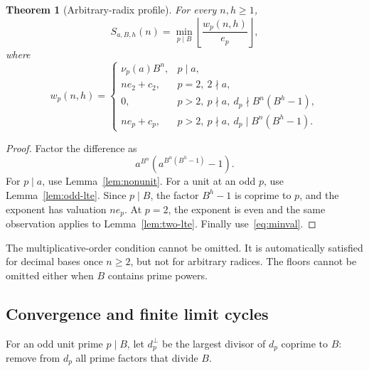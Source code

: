 \documentclass[11pt,a4paper]{article}
\newtheorem{theorem}{Theorem}[section]
\theoremstyle{definition}
\begin{document}
\begin{theorem}[Arbitrary-radix profile]\label{thm:radix-profile}
For every $n,h\ge1$,
\begin{equation}\label{eq:radix-profile}
S_{a,B,h}(n)=\min_{p\mid B}\left\lfloor\frac{w_p(n,h)}{e_p}\right\rfloor,
\end{equation}
where
\begin{equation}\label{eq:wp}
w_p(n,h)=
\begin{cases}
\nu_p(a)B^n,&p\mid a,\\
n e_2+c_2,&p=2,\ 2\nmid a,\\
0,&p>2,\ p\nmid a,\ d_p\nmid B^n(B^h-1),\\
n e_p+c_p,&p>2,\ p\nmid a,\ d_p\mid B^n(B^h-1).
\end{cases}
\end{equation}
\end{theorem}
\begin{proof}
Factor the difference as
\[
a^{B^n}\left(a^{B^n(B^h-1)}-1\right).
\]
For $p\mid a$, use Lemma~\ref{lem:nonunit}. For a unit at an odd $p$,
use Lemma~\ref{lem:odd-lte}. Since $p\mid B$, the factor $B^h-1$ is
coprime to $p$, and the exponent has valuation $ne_p$.
At $p=2$, the exponent is even and the same observation applies to
Lemma~\ref{lem:two-lte}. Finally use~\eqref{eq:minval}.
\end{proof}

The multiplicative-order condition cannot be omitted. It is automatically
satisfied for decimal bases once $n\ge2$, but not for arbitrary radices.
The floors cannot be omitted either when $B$ contains prime powers.

\subsection{Convergence and finite limit cycles}
For an odd unit prime $p\mid B$, let $d_p^{\perp}$ be the largest divisor
of $d_p$ coprime to $B$: remove from $d_p$ all prime factors that divide $B$.
\end{document}

